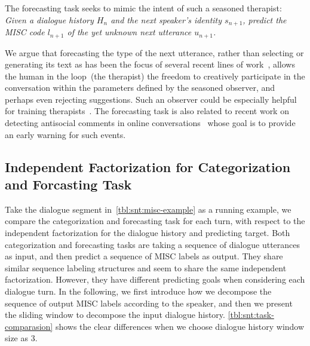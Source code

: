 The forecasting task seeks to mimic the intent of such a seasoned
therapist: \emph{Given a dialogue history $H_n$ and the next speaker's
  identity $s_{n+1}$, predict the MISC code $l_{n+1}$ of the yet
  unknown next utterance $u_{n+1}$.}

We argue that forecasting the type of the next utterance, rather than
selecting or generating its text as has been the focus of several
recent lines of work~\citep[\eg,][]{schatzmann2005quantitative,ubuntu,DSTC7},
allows the human in the loop~(the therapist) the freedom to
creatively participate in the conversation within the parameters
defined by the seasoned observer, and perhaps even rejecting
suggestions. Such an observer could be especially helpful for
training therapists~\citep{imel2017technology}.
%
The forecasting task is also related to recent work on detecting
antisocial comments in online
conversations~\citep{zhang2018conversations} whose goal is to
provide an early warning for such events.

\subsection[Independent Factorization for Categorization and
Forcasting Task]{Independent Factorization for Categorization \\and
  Forcasting Task}
\label{ssec:snt:comparative-tasks}

Take the dialogue segment in~\autoref{tbl:snt:misc-example} as a
running example, we compare the categorization and forecasting task
for each turn, with respect to the independent factorization for the
dialogue history and predicting target. Both categorization and
forecasting tasks are taking a sequence of dialogue utterances as
input, and then predict a sequence of MISC labels as output. They
share similar sequence labeling structures and seem to share the
same independent factorization. However, they have different
predicting goals when considering each dialogue turn. In the
following, we first introduce how we decompose the sequence of output
MISC labels according to the speaker, and then we present the
sliding window to decompose the input dialogue
history. \autoref{tbl:snt:task-comparasion} shows the clear
differences when we choose dialogue history window size as 3.

